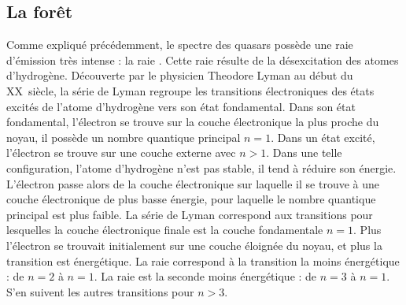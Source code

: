 \subsection{La forêt \lya{}}
\label{subsec:lya}
Comme expliqué précédemment, le spectre des quasars possède une raie d'émission très intense : la raie \lya{}. Cette raie résulte de la désexcitation des atomes d'hydrogène. Découverte par le physicien Theodore Lyman au début du \textsc{XX}\ieme~siècle, la série de Lyman regroupe les transitions électroniques des états excités de l'atome d'hydrogène vers son état fondamental. Dans son état fondamental, l'électron se trouve sur la couche électronique la plus proche du noyau, il possède un nombre quantique principal $n=1$. Dans un état excité, l'électron se trouve sur une couche externe avec $n > 1$. Dans une telle configuration, l'atome d'hydrogène n'est pas stable, il tend à réduire son énergie. L'électron passe alors de la couche électronique sur laquelle il se trouve à une couche électronique de plus basse énergie, pour laquelle le nombre quantique principal est plus faible. La série de Lyman correspond aux transitions pour lesquelles la couche électronique finale est la couche fondamentale $n=1$. Plus l'électron se trouvait initialement sur une couche éloignée du noyau, et plus la transition est énergétique. La raie \lya{} correspond à la transition la moins énergétique : de $n=2$ à $n=1$. La raie \lyb{} est la seconde moins énergétique : de $n=3$ à $n=1$. S'en suivent les autres transitions pour $n > 3$.

